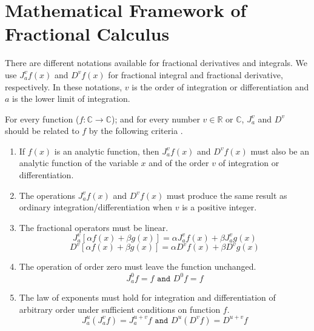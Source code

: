\documentclass {llncs}
\begin{document}
\section{Mathematical Framework of  Fractional Calculus} \label{sec:fractional_calculus}
 There are different notations available for fractional derivatives and integrals.
 We use $J^{v}_{a}f(x)$ and $D^{v}f(x)$ for fractional integral and fractional derivative, respectively.
  In these notations, $v$ is the order of integration or differentiation and $a$ is the lower limit of integration.

 For every function ($f:\mathbb{C}\rightarrow\mathbb{C}$); and for every number $v \in \mathbb{R}$ or $\mathbb{C}$, $J^{v}_{a}$ and $D^{v}$ should be related to $f$ by the following criteria \cite{Das:2007:FFC:1564573}.


\begin{enumerate}
\item If $f(x)$ is an analytic function, then $J^{v}_{a}f(x)$ and $D^{v}f(x)$ must also be an analytic function of the variable $x$ and of the order $v$ of integration or differentiation.
\item The operations  $J^{v}_{a}f(x)$ and $D^{v}f(x)$ must produce the same result as ordinary integration/differentiation when $v$ is a positive integer.
\item The fractional operators must be linear.
\begin{equation}
 J^{v}_{a} [\alpha f(x) + \beta g(x)] = \alpha J^{v}_{a} f(x) + \beta J^{v}_{a} g(x)
\end{equation}
\begin{equation}
 D^{v} [\alpha f(x) + \beta g(x)] = \alpha D^{v} f(x) + \beta D^{v} g(x)
\end{equation}


	\item The operation of order zero must leave the function unchanged.
\begin{equation}
  J^{0}_{a} f = f \texttt{\ \ \ \ and \ \ \  }  D^{0} f = f
\end{equation}
 	\item The law of exponents must hold for integration and differentiation  of arbitrary order under sufficient conditions on function $f$.
 \begin{equation}
  J^{u}_{a}( J^{v}_{a}f)=  J^{u + v}_{a} f \texttt{\ \ and \ \  }  D^{u}(D^{v}f)=  D^{u + v} f
\end{equation}
   \end{enumerate}
\end{document}
